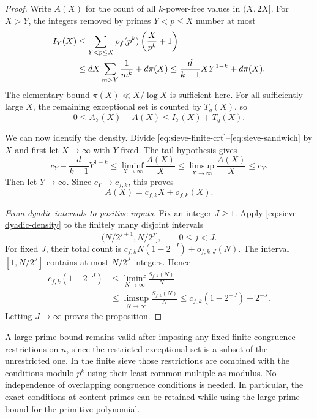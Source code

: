 \begin{proof}
Write $A(X)$ for the count of all $k$-power-free values in $(X,2X]$.
For $X>Y$, the integers removed by primes $Y<p\le X$ number at most
\begin{align}
 I_Y(X)
 &\le\sum_{Y<p\le X}\rho_f(p^k)
                    \left(\frac{X}{p^k}+1\right)\notag\\
 &\le dX\sum_{m>Y}\frac1{m^k}+d\pi(X)
 \le\frac{d}{k-1}XY^{1-k}+d\pi(X).
 \label{eq:sieve-intermediate}
\end{align}
The elementary bound $\pi(X)\ll X/\log X$ is sufficient here.
For all sufficiently large $X$, the remaining exceptional set is counted
by $T_g(X)$, so
\begin{equation}
 0\le A_Y(X)-A(X)\le I_Y(X)+T_g(X).
 \label{eq:sieve-sandwich}
\end{equation}

We can now identify the density. Divide
\eqref{eq:sieve-finite-crt}--\eqref{eq:sieve-sandwich} by $X$ and first
let $X\to\infty$ with $Y$ fixed. The tail hypothesis gives
\[
 c_Y-\frac{d}{k-1}Y^{1-k}
 \le\liminf_{X\to\infty}\frac{A(X)}X
 \le\limsup_{X\to\infty}\frac{A(X)}X
 \le c_Y.
\]
Then let $Y\to\infty$. Since $c_Y\to c_{f,k}$, this proves
\begin{equation}
 A(X)=c_{f,k}X+o_{f,k}(X).
 \label{eq:sieve-dyadic-density}
\end{equation}

\emph{From dyadic intervals to positive inputs.}
Fix an integer $J\ge1$. Apply \eqref{eq:sieve-dyadic-density} to the
finitely many disjoint intervals
\[
 (N/2^{j+1},N/2^j],\qquad 0\le j<J.
\]
For fixed $J$, their total count is
$c_{f,k}N(1-2^{-J})+o_{f,k,J}(N)$. The interval $[1,N/2^J]$ contains
at most $N/2^J$ integers. Hence
\[
 \begin{split}
 c_{f,k}(1-2^{-J})
 &\le\liminf_{N\to\infty}\frac{S_{f,k}(N)}N\\
 &\le\limsup_{N\to\infty}\frac{S_{f,k}(N)}N
 \le c_{f,k}(1-2^{-J})+2^{-J}.
 \end{split}
\]
Letting $J\to\infty$ proves the proposition.
\end{proof}

\begin{remark}\label{rem:sieve-congruences}
A large-prime bound remains valid after imposing any fixed finite
congruence restrictions on $n$, since the restricted exceptional set is
a subset of the unrestricted one. In the finite sieve those restrictions
are combined with the conditions modulo $p^k$ using their least common
multiple as modulus. No independence of overlapping congruence conditions
is needed. In particular, the exact conditions at content primes can be
retained while using the large-prime bound for the primitive polynomial.
\end{remark}


